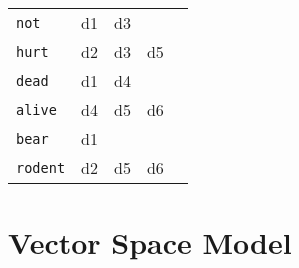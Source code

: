 \begin{table}[H]
\begin{tabular}{|l|c|c|c|c|c|c|c|}
						\texttt{not}          & d1                                      & d3                                       & \multicolumn{5}{c}{}                                                                                                                                                                                                          \\ \cline{1-4}
						\texttt{hurt}         & d2                                      & d3                                       & d5                                                & \multicolumn{4}{c}{}                                                                                                                                                      \\ \cline{1-4}
						\texttt{dead}         & d1                                      & d4                                       & \multicolumn{5}{c}{}                                                                                                                                                                                                          \\ \cline{1-4}
						\texttt{alive}        & d4                                      & d5                                       & d6                                                & \multicolumn{4}{c}{}                                                                                                                                                      \\ \cline{1-4}
						\texttt{bear}         & d1                                      & \multicolumn{6}{c}{}                                                                                                                                                                                                                                                     \\ \cline{1-4}
						\texttt{rodent}       & d2                                      & d5                                       & d6                                                & \multicolumn{4}{c}{}                                                                                                                                                      \\ \cline{1-4}
					\end{tabular}
				\end{table}

	\section{Vector Space Model} %

